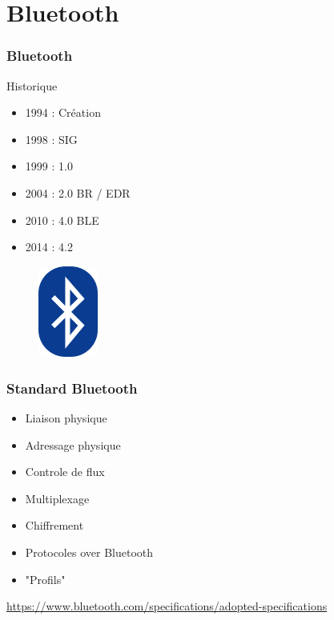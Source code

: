 \section{Bluetooth}

\begin{frame}[t]
	\frametitle{Bluetooth}

	\begin{minipage}[t]{0.50\linewidth}
		\begin{block}{Historique}
			\begin{itemize}
				\item 1994 : Création
				\item 1998 : SIG
				\item 1999 : 1.0
				\item 2004 : 2.0 BR / EDR
				\item 2010 : 4.0 BLE
				\item 2014 : 4.2
			\end{itemize}
		\end{block}
	\end{minipage}
	\begin{minipage}[t]{0.25\linewidth}
		\begin{figure}
			\includegraphics[height=3cm]{img/bt_logo.png}
		\end{figure}
	\end{minipage}
\end{frame}

\begin{frame}
	\frametitle{Standard Bluetooth}
	\vspace{0.5cm}
	\begin{itemize}
		\item Liaison physique
		\item Adressage physique
		\item Controle de flux
		\item Multiplexage
		\item Chiffrement
		\item Protocoles over Bluetooth
		\item "Profils"
	\end{itemize}
	\vspace{0.5cm}
	\tiny{\url{https://www.bluetooth.com/specifications/adopted-specifications}}
\end{frame}

